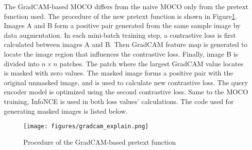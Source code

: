 \documentclass[12pt,twoside]{report}
\begin{document}




The GradCAM-based MOCO differs from the naive MOCO only from the pretext function used. The procedure of the new pretext function is shown in Figure\ref{fig:grad_perturb_explain}. Images A and B form a positive pair generated from the same sample image by data augmentation. In each mini-batch training step, a contrastive loss is first calculated between images A and B. Then GradCAM feature map is generated to locate the image region that influences the contrastive loss. Finally, image B is divided into $n \times n$ patches. The patch where the largest GradCAM value locates is masked with zero values. The masked image forms a positive pair with the original unmasked image, and is used to calculate new contrastive loss. The query encoder model is optimized using the second contrastive loss. Same to the MOCO training, InfoNCE is used in both loss values' calculations. The code used for generating masked images is listed below. 

\begin{figure}
  \centering
  \texttt{[image: figures/gradcam\_explain.png]}
  \caption{Procedure of the GradCAM-based pretext function}
  \label{fig:grad_perturb_explain}
\end{figure}
\end{document}
